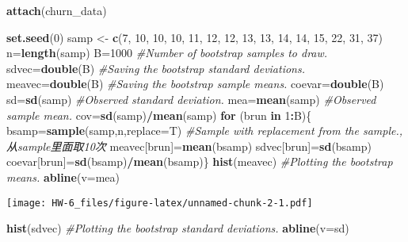 \documentclass[]{article}
\newenvironment{Shaded}{\begin{snugshade}}{\end{snugshade}}
\newcommand{\CommentTok}[1]{\textcolor[rgb]{0.56,0.35,0.01}{\textit{#1}}}
\newcommand{\ControlFlowTok}[1]{\textcolor[rgb]{0.13,0.29,0.53}{\textbf{#1}}}
\newcommand{\DataTypeTok}[1]{\textcolor[rgb]{0.13,0.29,0.53}{#1}}
\newcommand{\DecValTok}[1]{\textcolor[rgb]{0.00,0.00,0.81}{#1}}
\newcommand{\KeywordTok}[1]{\textcolor[rgb]{0.13,0.29,0.53}{\textbf{#1}}}
\newcommand{\NormalTok}[1]{#1}
\newcommand{\OperatorTok}[1]{\textcolor[rgb]{0.81,0.36,0.00}{\textbf{#1}}}
\newcommand{\StringTok}[1]{\textcolor[rgb]{0.31,0.60,0.02}{#1}}
\begin{document}
\begin{Shaded}
\begin{Highlighting}[]
\KeywordTok{attach}\NormalTok{(churn_data)}
\end{Highlighting}
\end{Shaded}

\begin{Shaded}
\begin{Highlighting}[]
\KeywordTok{set.seed}\NormalTok{(}\DecValTok{0}\NormalTok{)}
\NormalTok{samp <-}\StringTok{ }\KeywordTok{c}\NormalTok{(}\DecValTok{7}\NormalTok{, }\DecValTok{10}\NormalTok{, }\DecValTok{10}\NormalTok{, }\DecValTok{10}\NormalTok{, }\DecValTok{11}\NormalTok{, }\DecValTok{12}\NormalTok{, }\DecValTok{12}\NormalTok{, }\DecValTok{13}\NormalTok{, }\DecValTok{13}\NormalTok{, }\DecValTok{14}\NormalTok{, }\DecValTok{14}\NormalTok{, }\DecValTok{15}\NormalTok{, }\DecValTok{22}\NormalTok{, }\DecValTok{31}\NormalTok{, }\DecValTok{37}\NormalTok{)}
\NormalTok{n=}\KeywordTok{length}\NormalTok{(samp)}
\NormalTok{B=}\DecValTok{1000} \CommentTok{#Number of bootstrap samples to draw.}
\NormalTok{sdvec=}\KeywordTok{double}\NormalTok{(B) }\CommentTok{#Saving the bootstrap standard deviations.}
\NormalTok{meavec=}\KeywordTok{double}\NormalTok{(B) }\CommentTok{#Saving the bootstrap sample means.}
\NormalTok{coevar=}\KeywordTok{double}\NormalTok{(B)}
\NormalTok{sd=}\KeywordTok{sd}\NormalTok{(samp) }\CommentTok{#Observed standard deviation.}
\NormalTok{mea=}\KeywordTok{mean}\NormalTok{(samp) }\CommentTok{#Observed sample mean.}
\NormalTok{cov=}\KeywordTok{sd}\NormalTok{(samp)}\OperatorTok{/}\KeywordTok{mean}\NormalTok{(samp)}
\ControlFlowTok{for}\NormalTok{ (brun }\ControlFlowTok{in} \DecValTok{1}\OperatorTok{:}\NormalTok{B)\{}
\NormalTok{  bsamp=}\KeywordTok{sample}\NormalTok{(samp,n,}\DataTypeTok{replace=}\NormalTok{T) }\CommentTok{#Sample with replacement from the sample., 从sample里面取10次}
\NormalTok{  meavec[brun]=}\KeywordTok{mean}\NormalTok{(bsamp)}
\NormalTok{  sdvec[brun]=}\KeywordTok{sd}\NormalTok{(bsamp)}
\NormalTok{  coevar[brun]=}\KeywordTok{sd}\NormalTok{(bsamp)}\OperatorTok{/}\KeywordTok{mean}\NormalTok{(bsamp)\}}
\KeywordTok{hist}\NormalTok{(meavec) }\CommentTok{#Plotting the bootstrap means.}
\KeywordTok{abline}\NormalTok{(}\DataTypeTok{v=}\NormalTok{mea)}
\end{Highlighting}
\end{Shaded}

\texttt{[image: HW-6\_files/figure-latex/unnamed-chunk-2-1.pdf]}

\begin{Shaded}
\begin{Highlighting}[]
\KeywordTok{hist}\NormalTok{(sdvec) }\CommentTok{#Plotting the bootstrap standard deviations.}
\KeywordTok{abline}\NormalTok{(}\DataTypeTok{v=}\NormalTok{sd)}
\end{Highlighting}
\end{Shaded}
\end{document}

